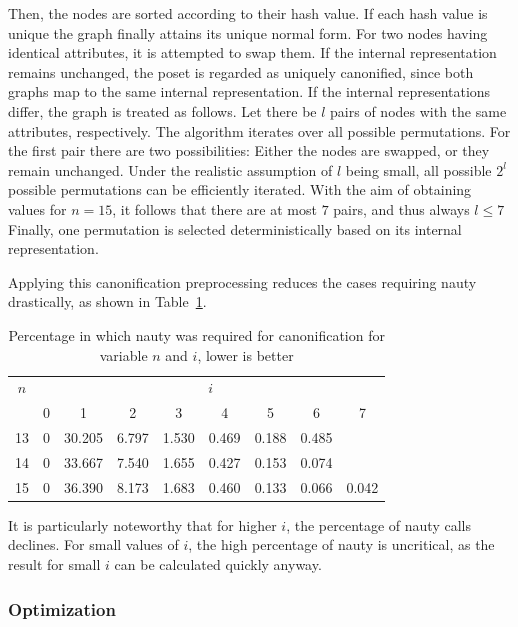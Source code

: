 \documentclass[10pt,journal,compsoc]{IEEEtran}
\begin{document}
Then, the nodes are sorted according to their hash value.
If each hash value is unique the graph finally attains its unique normal form.
For two nodes having identical attributes, it is attempted to swap them.
If the internal representation remains unchanged, the poset is regarded as uniquely canonified, since both graphs map to the same internal representation.
If the internal representations differ, the graph is treated as follows.
Let there be $l$ pairs of nodes with the same attributes, respectively.
The algorithm iterates over all possible permutations.
For the first pair there are two possibilities: Either the nodes are swapped, or they remain unchanged.
Under the realistic assumption of $l$ being small, all possible $2^l$ possible permutations can be efficiently iterated.
With the aim of obtaining values for $n = 15$, it follows that there are at most $7$ pairs, and thus always $l \leq 7$
Finally, one permutation is selected deterministically based on its internal representation.

Applying this canonification preprocessing reduces the cases requiring nauty drastically, as shown in Table~\ref{table:nauty-ratio}.

\begin{table}
  \begin{tabular}{c|cccccccc}
    $n$ & \multicolumn{8}{c}{$i$}                                                          \\
        & 0                       & 1      & 2     & 3     & 4     & 5     & 6     & 7     \\ \hline
    13  & 0                       & 30.205 & 6.797 & 1.530 & 0.469 & 0.188 & 0.485         \\
    14  & 0                       & 33.667 & 7.540 & 1.655 & 0.427 & 0.153 & 0.074         \\
    15  & 0                       & 36.390 & 8.173 & 1.683 & 0.460 & 0.133 & 0.066 & 0.042 \\
  \end{tabular}
  \centering
  \caption{Percentage in which nauty was required for canonification for variable $n$ and $i$, lower is better}
  \label{table:nauty-ratio}
\end{table}

It is particularly noteworthy that for higher $i$, the percentage of nauty calls declines.
For small values of $i$, the high percentage of nauty is uncritical, as the result for small $i$ can be calculated quickly anyway.

\subsubsection{Optimization}
\end{document}
